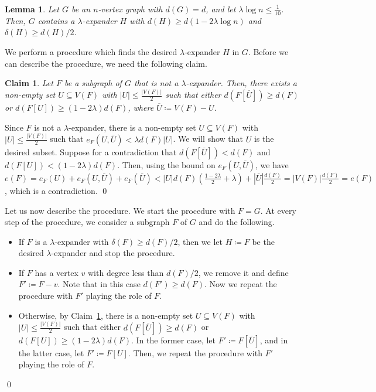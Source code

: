 \documentclass[10pt]{article}
\theoremstyle{plain}
\numberwithin{theorem}{section}
\newtheorem{lemma}[theorem]{Lemma}
\newtheorem{claim}{Claim}[theorem]
\theoremstyle{definition}
\theoremstyle{remark}
\renewenvironment{proof}[1][]{\begin{trivlist}
\item[\hspace{\labelsep}{\bf\noindent Proof#1.\/}] }{\qed\end{trivlist}}
\renewcommand{\setminus}{-}
\theoremstyle{plain}
\begin{document}
\begin{lemma}
	\label{lem::findexpander}
	Let $G$ be an $n$-vertex graph with $d(G) = d$, and let $\lambda \log n \le \frac{1}{10}$. Then, $G$ contains a $\lambda$-expander $H$ with $d(H) \ge d(1 - 2 \lambda \log n)$ and $\delta(H) \ge d(H)/2$.
\end{lemma}
\begin{proof}
	We perform a procedure which finds the desired $\lambda$-expander $H$ in $G$. Before we can describe the procedure, we need the following claim.
	\begin{claim}
		\label{claim:iterateexpander}
		Let $F$ be a subgraph of $G$ that is not a $\lambda$-expander. 
Then, there exists a non-empty set $U \subseteq V(F)$ with 
$|U| \le \frac{|V(F)|}{2}$ such that either 
$d(F[\overline U]) \ge d(F)$ or 
$d(F[U]) \ge (1-2\lambda)d(F)$, 
where $\overline U \coloneqq V(F)\setminus U$.
	\end{claim}
	\begin{proof}[ of claim] 
		Since $F$ is not a $\lambda$-expander, there is a non-empty set $U \subseteq V(F)$ with $|U| \leq \frac{|V(F)|}{2}$ such that $e_F(U,\overline{U}) < \lambda d(F) |U|$. We will show that $U$ is the desired subset. Suppose for a contradiction that $d(F[\overline{U}]) < d(F)$ and $d(F[U])< (1-2\lambda)d(F)$. Then, using the bound on $e_F(U,\overline{U})$, we have $e(F) = e_F(U) + e_F(U,\overline{U}) + e_F(\overline{U})  < |U| d(F) \left( \frac{1-2\lambda}{2} + \lambda \right) + |\overline{U}| \frac{d(F)}{2} = |V(F)| \frac{d(F)}{2} = e(F)$, which is a contradiction.   
	\end{proof}

	Let us now describe the procedure. We start the procedure with $F = G$. At every step of the procedure, we consider a subgraph $F$ of $G$ and do the following. 

	\begin{itemize}
		\item If $F$ is a $\lambda$-expander with $\delta(F) \ge d(F)/2$, then we let $H \coloneqq F$ be the desired $\lambda$-expander and stop the procedure. 
		\item If $F$ has a vertex $v$ with degree less than $d(F)/2$, we remove it and define $F' \coloneqq F \setminus v$. Note that in this case $d(F') \ge d(F)$. Now we repeat the procedure with $F'$ playing the role of $F$.
  
		\item Otherwise, by Claim~\ref{claim:iterateexpander}, there is a non-empty set $U \subseteq V(F)$ with $|U| \leq \frac{|V(F)|}{2}$ such that either $d(F[\overline{U}]) \geq d(F)$ or $d(F[U]) \geq (1-2\lambda)d(F)$. In the former case, let $F' \coloneqq F[\overline{U}]$, and in the latter case, let $F' \coloneqq F[U]$. Then, we repeat the procedure with $F'$ playing the role of $F$.
	\end{itemize}


\end{proof}
\end{document}
